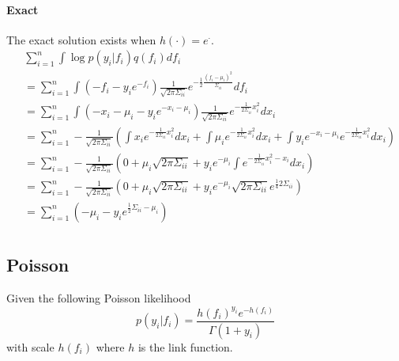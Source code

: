 \documentclass[5p,11pt]{article}
\begin{document}
\paragraph{Exact} The exact solution exists when $h(\cdot) = e^\cdot$.
\begin{equation}
    \begin{aligned}
    &\sum_{i=1}^n \int \log p(y_i|f_i) q(f_i) df_i\\
    &= \sum_{i=1}^n \int (-f_i - y_i e^{-f_i}) \frac{1}{\sqrt{2\pi\Sigma_{ii}}}e^{-\frac{1}{2}\frac{(f_i-\mu_i)^2}{\Sigma_{ii}}} df_i\\
    &= \sum_{i=1}^n \int (-x_i - \mu_i - y_i e^{-x_i-\mu_i}) \frac{1}{\sqrt{2\pi\Sigma_{ii}}}e^{-\frac{1}{2\Sigma_{ii}} x_i^2} dx_i\\
    &= \sum_{i=1}^n -\frac{1}{\sqrt{2\pi\Sigma_{ii}}} \left( \int x_i e^{-\frac{1}{2\Sigma_{ii}} x_i^2} dx_i + \int \mu_i e^{-\frac{1}{2\Sigma_{ii}} x_i^2} dx_i + \int y_i e^{-x_i-\mu_i} e^{-\frac{1}{2\Sigma_{ii}} x_i^2} dx_i \right)\\
    &= \sum_{i=1}^n -\frac{1}{\sqrt{2\pi\Sigma_{ii}}} \left( 0 + \mu_i \sqrt{2\pi\Sigma_{ii}} + y_i e^{-\mu_i} \int e^{-\frac{1}{2\Sigma_{ii}} x_i^2 - x_i} dx_i \right)\\
    &= \sum_{i=1}^n -\frac{1}{\sqrt{2\pi\Sigma_{ii}}} \left( 0 + \mu_i \sqrt{2\pi\Sigma_{ii}} + y_i e^{-\mu_i} \sqrt{2\pi\Sigma_{ii}} e^{\frac{1}{4}2\Sigma_{ii}} \right)\\
    &= \sum_{i=1}^n \left( -\mu_i - y_i e^{\frac{1}{2}\Sigma_{ii} - \mu_i} \right) \\
    \end{aligned}
\end{equation}

\subsection{Poisson}
Given the following Poisson likelihood
$$ p(y_i|f_i) = \frac{h(f_i)^{y_i} e^{-h(f_i)}}{\Gamma(1+y_i)} $$
with scale $h(f_i)$ where $h$ is the link function.
\end{document}

